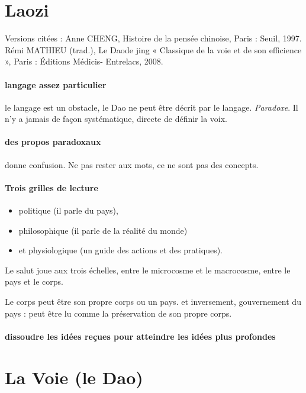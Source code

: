 \section{Laozi}



Versions citées :
Anne CHENG, Histoire de la pensée chinoise, Paris : Seuil, 1997.
Rémi MATHIEU (trad.), Le Daode jing « Classique de la voie et de son efficience », Paris : Éditions Médicis- Entrelacs, 2008.


\paragraph{langage assez particulier} le langage est un obstacle, le Dao ne peut être décrit par le langage. \textit{Paradoxe}. Il n'y a jamais de façon systématique, directe de définir la voix. 

\paragraph{des propos paradoxaux} donne confusion. Ne pas rester aux mots, ce ne sont pas des concepts. 

\paragraph{Trois grilles de lecture} \begin{itemize}
    \item politique (il parle du pays),     \item philosophique (il parle de la réalité du monde)     \item et physiologique (un guide des actions et des pratiques).
\end{itemize}
Le salut joue aux trois échelles, entre le microcosme et le macrocosme, entre le pays et le corps. 

\begin{Ex}[Corps]
    Le corps peut être son propre corps ou un pays.
    et inversement, gouvernement du pays : peut être lu comme la préservation de son propre corps.
\end{Ex}


\paragraph{dissoudre les idées reçues pour atteindre les idées plus profondes}


\section{La Voie (le Dao)}

